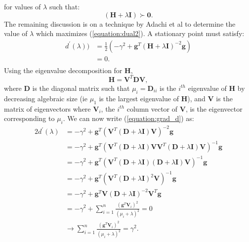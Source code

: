 \documentclass[letterpaper,12pt,titlepage,oneside,final]{book}
\begin{document}
	 for values of $\lambda$ such that:
	\begin{equation}
	(\mathbf{H} + \lambda\mathbf{I}) \succ \mathbf{0}.
	\label{equation:possemdef}
	\end{equation}
	 The remaining discussion is on a technique by Adachi et al \cite{adachi.paper} to determine the value of $\lambda$ which maximizes (\ref{equation:dual2}). A stationary point must satisfy:
	\begin{equation}
	\begin{aligned}
	d^{\prime}(\lambda)) & = \frac{1}{2} ( -\gamma^{2} + \mathbf{g}^{T}(\mathbf{H} + \lambda\mathbf{I})^{-2}\mathbf{g}) \\ & = 0. \\
	\end{aligned}
	\label{equation:grad_d}
	\end{equation}
	Using the eigenvalue decomposition for $\mathbf{H}$,
	\begin{equation}
	\mathbf{H} = \mathbf{V}^{T}\mathbf{D}\mathbf{V},
	\end{equation}
	where $\mathbf{D}$ is the diagonal matrix such that $\mu_{i} = \mathbf{D}_{ii}$ is the $i^{th}$ eigenvalue of $\mathbf{H}$ by decreasing algebraic size (ie $\mu_{1}$ is the largest eigenvalue of $\mathbf{H}$), and $\mathbf{V}$ is the matrix of eigenvectors where $\mathbf{V}_{i}$, the $i^{th}$ column vector of \textbf{V}, is the eigenvector corresponding to $\mu_{i}$. We can now write (\ref{equation:grad_d}) as:
	\begin{equation}
	\begin{aligned}
	2d^\prime(\lambda) & = -\gamma^{2} + \mathbf{g}^{T}(\mathbf{V}^{T}(\mathbf{D} + \lambda\mathbf{I})\mathbf{V})^{-2}\mathbf{g} \\
	& = -\gamma^{2} + \mathbf{g}^{T}(\mathbf{V}^{T}(\mathbf{D} + \lambda\mathbf{I})\mathbf{V}\mathbf{V}^{T}(\mathbf{D} + \lambda\mathbf{I})\mathbf{V})^{-1}\mathbf{g}  \\
	& = -\gamma^{2} + \mathbf{g}^{T}(\mathbf{V}^{T}(\mathbf{D} + \lambda\mathbf{I})(\mathbf{D} + \lambda\mathbf{I})\mathbf{V})^{-1}\mathbf{g}  \\ 
	& = -\gamma^{2} + \mathbf{g}^{T}(\mathbf{V}^{T}(\mathbf{D} + \lambda\mathbf{I})^{2}\mathbf{V})^{-1}\mathbf{g}  \\ 
	& = -\gamma^{2} + \mathbf{g}^{T}\mathbf{V}(\mathbf{D} + \lambda\mathbf{I})^{-2}\mathbf{V}^{T}\mathbf{g} \\
	& = -\gamma^{2} + \sum_{i=1}^{n}{\frac{(\mathbf{g}^{T}\mathbf{V}_{i})^{2}}{(\mu_{i} + \lambda)^{2}}} = 0\\ 
	&  \rightarrow \sum_{i=1}^{n}{\frac{(\mathbf{g}^{T}\mathbf{V}_{i})^{2}}{(\mu_{i} + \lambda)^{2}}} = \gamma^{2}.
	\end{aligned}
	\label{equation:grad_lagrangian2}
	\end{equation}
\end{document}
